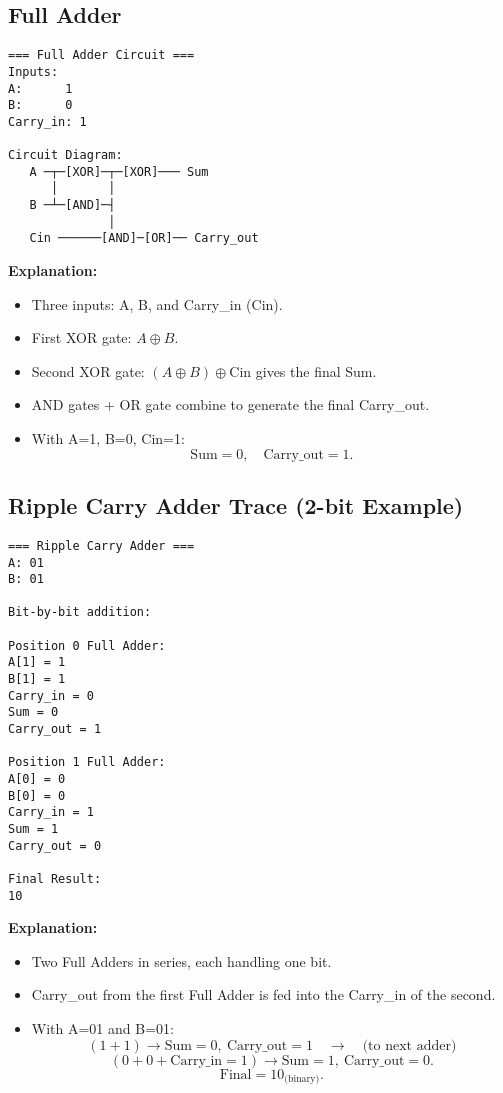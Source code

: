 \documentclass[12pt]{article}
\begin{document}
\subsection{Full Adder}
\begin{verbatim}
=== Full Adder Circuit ===
Inputs:
A:      1
B:      0
Carry_in: 1

Circuit Diagram:
   A ─┬─[XOR]─┬─[XOR]─── Sum
      │       │
   B ─┴─[AND]─┤
              │
   Cin ──────[AND]─[OR]── Carry_out
\end{verbatim}

\noindent \textbf{Explanation:}
\begin{itemize}
    \item Three inputs: A, B, and Carry\_in (Cin).
    \item First XOR gate: $A \oplus B$.
    \item Second XOR gate: $(A \oplus B) \oplus \text{Cin}$ gives the final Sum.
    \item AND gates + OR gate combine to generate the final Carry\_out.
    \item With A=1, B=0, Cin=1:
      \[
        \text{Sum} = 0, \quad \text{Carry\_out} = 1.
      \]
\end{itemize}

\subsection{Ripple Carry Adder Trace (2-bit Example)}
\begin{verbatim}
=== Ripple Carry Adder ===
A: 01
B: 01

Bit-by-bit addition:

Position 0 Full Adder:
A[1] = 1
B[1] = 1
Carry_in = 0
Sum = 0
Carry_out = 1

Position 1 Full Adder:
A[0] = 0
B[0] = 0
Carry_in = 1
Sum = 1
Carry_out = 0

Final Result:
10
\end{verbatim}

\noindent \textbf{Explanation:}
\begin{itemize}
  \item Two Full Adders in series, each handling one bit.
  \item Carry\_out from the first Full Adder is fed into the Carry\_in of the second.
  \item With A=01 and B=01:
    \[
      (1 + 1) \to \text{Sum}=0,\ \text{Carry\_out}=1 \quad\longrightarrow\quad \text{(to next adder)}
    \]
    \[
      (0 + 0 + \text{Carry\_in}=1) \to \text{Sum}=1,\ \text{Carry\_out}=0.
    \]
    \[
      \text{Final} = 10_{\text{(binary)}}.
    \]
\end{itemize}
\end{document}
